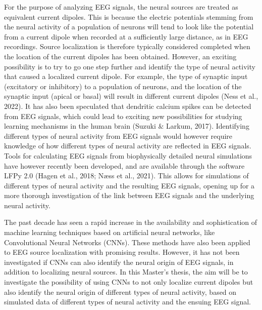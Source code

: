 \documentclass[a4paper,onecolumn,11pt]{revtex4-1}
\begin{document}
For the purpose of analyzing EEG signals, the neural sources are treated as equivalent current dipoles. This is because the electric potentials stemming from the neural activity of a population of neurons will tend to look like the potential from a current dipole when recorded at a sufficiently large distance, as in EEG recordings. Source localization is therefore typically considered completed when the location of the current dipoles has been obtained. However, an exciting possibility is to try to go one step further and identify the type of neural activity that caused a localized current dipole. For example, the type of synaptic input (excitatory or inhibitory) to a population of neurons, and the location of the synaptic input (apical or basal) will result in different current dipoles (Ness et al., 2022). It has also been speculated that dendritic calcium spikes can be detected from EEG signals, which could lead to exciting new possibilities for studying learning mechanisms in the human brain (Suzuki $\&$ Larkum, 2017). Identifying different types of neural activity from EEG signals would however require knowledge of how different types of neural activity are reflected in EEG signals. Tools for calculating EEG signals from biophysically detailed neural simulations have however recently been developed, and are available through the software LFPy 2.0 (Hagen et al., 2018; Næss et al., 2021). This allows for simulations of different types of neural activity and the resulting EEG signals, opening up for a more thorough investigation of the link between EEG signals and the underlying neural activity.

The past decade has seen a rapid increase in the availability and sophistication of machine learning techniques based on artificial neural networks, like Convolutional Neural Networks (CNNs). These methods have also been applied to EEG source localization with promising results. However, it has not been investigated if CNNs can also identify the neural origin of EEG signals, in addition to localizing neural sources. In this Master’s thesis, the aim will be to investigate the possibility of using CNNs to not only localize current dipoles but also identify the neural origin of different types of neural activity, based on simulated data of different types of neural activity and the ensuing EEG signal.
\end{document}
